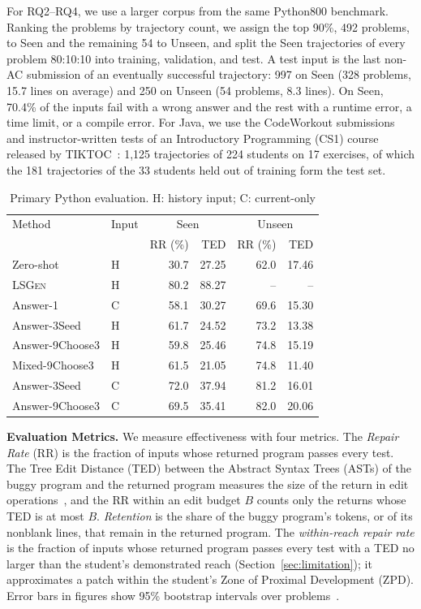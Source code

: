\documentclass[10pt,conference]{IEEEtran}
\begin{document}
For RQ2--RQ4, we use a larger corpus from the same Python800 benchmark. Ranking the problems by trajectory count, we assign the top 90\%, 492 problems, to Seen and the remaining 54 to Unseen, and split the Seen trajectories of every problem 80:10:10 into training, validation, and test. A test input is the last non-AC submission of an eventually successful trajectory: 997 on Seen (328 problems, 15.7 lines on average) and 250 on Unseen (54 problems, 8.3 lines). On Seen, 70.4\% of the inputs fail with a wrong answer and the rest with a runtime error, a time limit, or a compile error. For Java, we use the CodeWorkout submissions and instructor-written tests of an Introductory Programming (CS1) course released by TIKTOC~\cite{duan2025test}: 1,125 trajectories of 224 students on 17 exercises, of which the 181 trajectories of the 33 students held out of training form the test set.

\begin{table}[h]
\caption{Primary Python evaluation. H: history input; C: current-only}
\label{tab:main}
\centering\small
\begin{tabular}{@{}ll||rr|rr@{}}
\toprule
Method & Input & \multicolumn{2}{c|}{Seen} & \multicolumn{2}{c}{Unseen} \\
 & & RR (\%) & TED & RR (\%) & TED \\
\midrule
Zero-shot & H & 30.7 & 27.25 & 62.0 & 17.46 \\
\textsc{LSGen} & H & 80.2 & 88.27 & -- & -- \\
Answer-1 & C & 58.1 & 30.27 & 69.6 & 15.30 \\
Answer-3Seed & H & 61.7 & 24.52 & 73.2 & 13.38 \\
Answer-9Choose3 & H & 59.8 & 25.46 & 74.8 & 15.19 \\
Mixed-9Choose3 & H & 61.5 & 21.05 & 74.8 & 11.40 \\
\midrule
Answer-3Seed & C & 72.0 & 37.94 & 81.2 & 16.01 \\
Answer-9Choose3 & C & 69.5 & 35.41 & 82.0 & 20.06 \\
\bottomrule
\end{tabular}
\end{table}

\noindent\textbf{Evaluation Metrics.} We measure effectiveness with four metrics. The \emph{Repair Rate} (RR) is the fraction of inputs whose returned program passes every test. The Tree Edit Distance (TED) between the Abstract Syntax Trees (ASTs) of the buggy program and the returned program measures the size of the return in edit operations~\cite{zhang1989simple,pawlik2016tree}, and the RR within an edit budget \(B\) counts only the returns whose TED is at most \(B\). \emph{Retention} is the share of the buggy program's tokens, or of its nonblank lines, that remain in the returned program. The \emph{within-reach repair rate} is the fraction of inputs whose returned program passes every test with a TED no larger than the student's demonstrated reach (Section~\ref{sec:limitation}); it approximates a patch within the student's Zone of Proximal Development (ZPD). Error bars in figures show 95\% bootstrap intervals over problems~\cite{efron1992bootstrap}.
\end{document}
